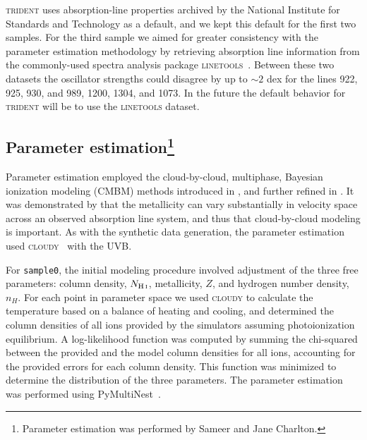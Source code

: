 \documentclass[fleqn,usenatbib]{mnras}
\begin{document}
\textsc{trident} uses absorption-line properties archived by the National Institute for Standards and Technology as a default, and we kept this default for the first two samples.
For the third sample we aimed for greater consistency with the parameter estimation methodology by retrieving absorption line information from the commonly-used spectra analysis package \textsc{linetools}~\citep{prochaska2016Linetools}.
Between these two datasets the oscillator strengths could disagree by up to $\sim 2$ dex for the lines  922, 925, 930, and 989,  1200,  1304, and  1073.
In the future the default behavior for \textsc{trident} will be to use the \textsc{linetools} dataset.

\subsection[Parameter estimation]{Parameter estimation\footnote{
 Parameter estimation was performed by Sameer and Jane Charlton.}}
\label{s:  parameter estimation}

 Parameter estimation employed the cloud-by-cloud, multiphase, Bayesian ionization modeling (CMBM) methods introduced in \cite{sameer2021Cloudbycloud}, and further refined in \cite{sameer2022Probing}.
 It was demonstrated by \cite{Prochter2010,lehner2019COS,Wotta2019,Zahedy2021,lehner2022Intermediate} that the metallicity can vary substantially in velocity space across an observed absorption line system, and thus that cloud-by-cloud modeling is important.
 As with the synthetic data generation, the  parameter estimation used \textsc{cloudy}~\citep{ferland20132013} with the \cite{haardt2012RADIATIVE} UVB.

For \texttt{sample0}, the initial modeling procedure involved adjustment of the three free parameters:
 column density, $N_{\ion{H}{I}}$, metallicity, $Z$, and hydrogen number density, $n_H$.
For each point in parameter space we used \textsc{cloudy} to calculate the temperature based on a balance of heating and cooling,
and determined the column densities of all ions provided by the simulators assuming photoionization equilibrium.
A log-likelihood function was computed by summing the chi-squared between the provided and the model column densities for all ions, accounting for the provided errors for each column density.
This function was minimized to determine the distribution of the three parameters.
The parameter estimation was performed using PyMultiNest~\citep{buchner2014Statistical}. 
\end{document}
